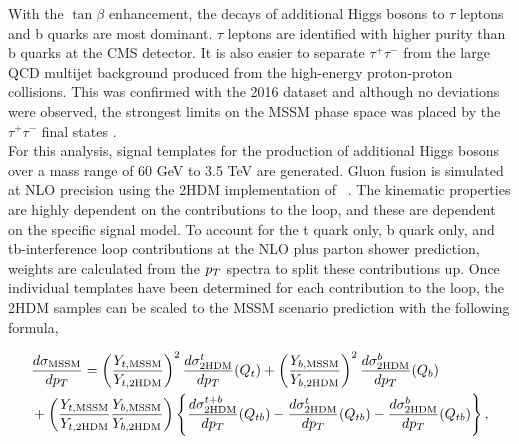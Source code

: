 With the $\tan\beta$ enhancement, the decays of additional Higgs bosons to $\tau$ leptons and b quarks are most dominant.
$\tau$ leptons are identified with higher purity than b quarks at the \ac{CMS} detector.
It is also easier to separate $\tau^{+}\tau^{-}$ from the large \ac{QCD} multijet background produced from the high-energy proton-proton collisions.
This was confirmed with the 2016 dataset and although no deviations were observed, the strongest limits on the \ac{MSSM} phase space was placed by the $\tau^+\tau^-$ final states \cite{CMS_MSSM_Tau_2018,CMS:2018hir}. \\

For this analysis, signal templates for the production of additional Higgs bosons over a mass range of 60 GeV to 3.5 TeV are generated.
Gluon fusion is simulated at \ac{NLO} precision using the \ac{2HDM} implementation of ~\cite{Nason:2004rx,Frixione:2007vw,Alioli:2010xd,Jezo:2015aia}.
The kinematic properties are highly dependent on the contributions to the loop, and these are dependent on the specific signal model.
To account for the t quark only, b quark only, and tb-interference loop contributions at the \ac{NLO} plus parton shower prediction, weights are calculated from the $p_{T}$ spectra to split these contributions up.
Once individual templates have been determined for each contribution to the loop, the \ac{2HDM} samples can be scaled to the \ac{MSSM} scenario prediction with the following formula,

\begin{align}
& \frac{d\sigma_{\text{MSSM}}}{dp_{T}}  = \left(\frac{Y_{t,\text{MSSM}}}{Y_{t,\text{2HDM}}}\right)^{2}\frac{d\sigma^{t}_{\text{2HDM}}}{dp_{T}}(Q_{t}) + \left(\frac{Y_{b,\text{MSSM}}}{Y_{b,\text{2HDM}}}\right)^{2}\frac{d\sigma^{b}_{\text{2HDM}}}{dp_{T}}(Q_{b}) \nonumber \\
& + \left(\frac{Y_{t,\text{MSSM}}}{Y_{t,\text{2HDM}}}\frac{Y_{b,\text{MSSM}}}{Y_{b,\text{2HDM}}}\right) \left\{ \frac{d\sigma^{t+b}_{\text{2HDM}}}{dp_{T}}(Q_{tb}) - \frac{d\sigma^{t}_{\text{2HDM}}}{dp_{T}}(Q_{tb}) - \frac{d\sigma^{b}_{\text{2HDM}}}{dp_{T}}(Q_{tb}) \right\} ,
\label{eqn:mssm_xs}
\end{align}
\vspace{0.2cm}

